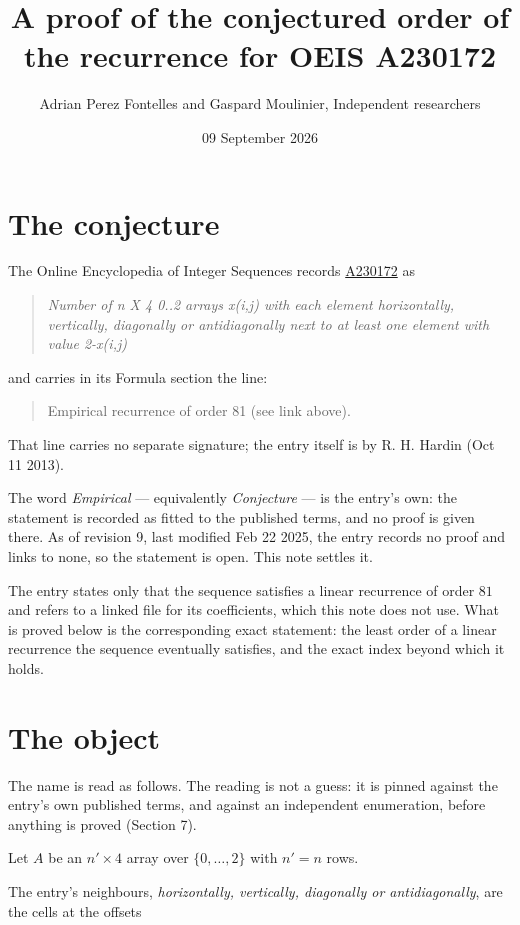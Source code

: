 \documentclass[11pt]{article}
\title{A proof of the conjectured order of the recurrence for OEIS A230172}
\author{Adrian Perez Fontelles and Gaspard Moulinier, Independent researchers}
\date{09 September 2026}
\theoremstyle{definition}
\begin{document}
\maketitle
\section{The conjecture}

The Online Encyclopedia of Integer Sequences records \href{https://oeis.org/A230172}{A230172} as

\begin{quote}\itshape Number of n X 4 0..2 arrays x(i,j) with each element horizontally, vertically, diagonally or antidiagonally next to at least one element with value 2-x(i,j)\end{quote}

and carries in its Formula section the line:

\begin{quote}\ttfamily Empirical recurrence of order 81 (see link above).\end{quote}

That line carries no separate signature; the entry itself is by R. H. Hardin (Oct 11 2013).

The word {\itshape Empirical} --- equivalently {\itshape Conjecture} --- is the entry's own: the statement is recorded as fitted to the published terms, and no proof is given there. As of revision 9, last modified Feb 22 2025, the entry records no proof and links to none, so the statement is open. This note settles it.

The entry states only that the sequence satisfies a linear recurrence of order $81$ and refers to a linked file for its coefficients, which this note does not use. What is proved below is the corresponding exact statement: the least order of a linear recurrence the sequence eventually satisfies, and the exact index beyond which it holds.

\section{The object}

The name is read as follows. The reading is not a guess: it is pinned against the entry's own published terms, and against an independent enumeration, before anything is proved (Section 7).

Let $A$ be an $n' \times 4$ array over $\{0,\dots,2\}$ with $n' = n$ rows.

The entry's neighbours, {\itshape horizontally, vertically, diagonally or antidiagonally}, are the cells at the offsets
\end{document}

